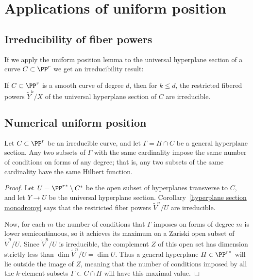  \section{Applications of uniform position}
\subsection{Irreducibility of fiber powers}
If we apply the uniform position lemma to the universal hyperplane section of a curve $C \subset \PP^r$ we get an irreducibility result:

\begin{corollary}\label{hyperplane section monodromy} If $C\subset \PP^r$ is a smooth curve of degree $d$, then 
for $k\leq d$, the restricted fibered powers $\tilde Y^k/X$  of the universal hyperplane section 
of $C$ are irreducible.
\end{corollary}

\subsection{Numerical uniform position}
\begin{corollary}\label{numerical uniform position lemma}
Let $C\subset \PP^r$ be an irreducible curve, and let $\Gamma = H\cap C$ be a general hyperplane section. Any two subsets of $\Gamma$ with the same cardinality impose the same number of conditions on forms of any degree; that is, any two subsets of the same cardinality have the same Hilbert function.
\end{corollary}


\begin{proof} Let $U = {\PP^r}^* \setminus C^*$ be the open subset of hyperplanes transverse to $C$, and let $Y\to U$ be the universal hyperplane section.
Corollary~\ref{hyperplane section monodromy} says that the restricted fiber powers $\tilde V^n/U$ are irreducible.

Now, for each $m$ the number of conditions that $\Gamma$ imposes on forms of degree $m$ is lower semicontinuous, so it achieves its maximum on a Zariski open subset of $\tilde V^n/U$. Since $\tilde V^n/U$ is irreducible, the complement $Z$ of this open set has dimension strictly less than $\dim \tilde V^n/U = \dim U$. Thus a general hyperplane $H \in {\PP^r}^*$ will lie outside the image of $Z$, meaning that the number of conditions imposed by all the $k$-element subsets $\Gamma \subset C \cap H$ will have this maximal value.
\end{proof}

